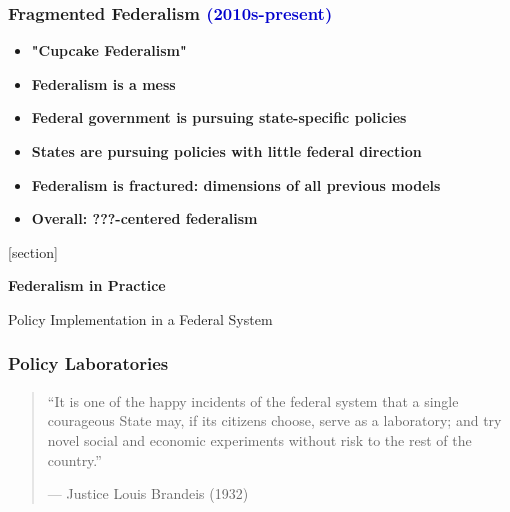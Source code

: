 \documentclass[10pt]{beamer}
\begin{document}
\begin{frame}
\frametitle{Fragmented Federalism \textcolor{mediumblue}{(2010s-present)}}

\begin{center}
\end{center}

\begin{itemize}
\item<1-> \textbf{"Cupcake Federalism"}
\item<2-> \textbf{Federalism is a mess}
\item<3-> \textbf{Federal government is pursuing state-specific policies}
\item<4-> \textbf{States are pursuing policies with little federal direction}
\item<5-> \textbf{Federalism is fractured: dimensions of all previous models}
\item<6-> \textbf{Overall: ???-centered federalism}
\end{itemize}

\end{frame}

{
[section]
\begin{frame}[plain]
\vspace{1.5cm}
\begin{center}
{\Huge\color{white}\textbf{Federalism in Practice}}

\vspace{0.5cm}
{\large\color{white}Policy Implementation in a Federal System}
\end{center}
\end{frame}
}

\begin{frame}
\frametitle{Policy Laboratories}

\pause
\begin{quotation}
``It is one of the happy incidents of the federal system that a single courageous State may, if its citizens choose, serve as a laboratory; and try novel social and economic experiments without risk to the rest of the country.''

\vspace{0.5cm}
\hfill --- Justice Louis Brandeis (1932)
\end{quotation}

\end{frame}
\end{document}
